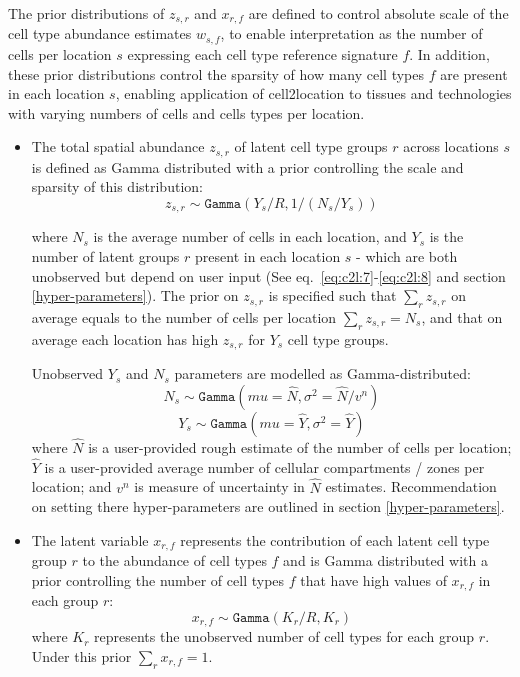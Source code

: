 \documentclass[11pt,a4paper]{article}
\begin{document}
\begin{enumerate}
    The prior distributions of $z_{s,r}$ and $x_{r,f}$ are defined to control absolute scale of the cell type abundance estimates $w_{s,f}$, to enable interpretation as the number of cells per location $s$ expressing each cell type reference signature $f$. In addition, these prior distributions control the sparsity of how many cell types $f$ are present in each location $s$, enabling application of cell2location to tissues and technologies with varying numbers of cells and cells types per location.
    
    \begin{itemize}
        \item The total spatial abundance $z_{s,r}$ of latent cell type groups $r$ across locations $s$ is defined as Gamma distributed with a prior controlling the scale and sparsity of this distribution:
        \begin{equation} \label{eq:c2l:6}
        z_{s,r} \sim \mathtt{Gamma}(Y_s / R, 1 / (N_s / Y_s))
        \end{equation}
    
        where $N_s$ is the average number of cells in each location, and $Y_s$ is the number of latent groups $r$  present in each location $s$ - which are both unobserved but depend on user input (See eq.~\eqref{eq:c2l:7}-\eqref{eq:c2l:8} and  section \ref{hyper-parameters}). The prior on $z_{s,r}$ is specified such that $\sum_{r} z_{s,r}$ on average equals to the number of cells per location $\sum_{r} z_{s,r} = N_s$, and that on average each location has high $z_{s,r}$ for $Y_s$ cell type groups. 
        
        Unobserved $Y_s$ and $N_s$ parameters are modelled as Gamma-distributed:
        \begin{equation} \label{eq:c2l:7}
        N_s \sim \mathtt{Gamma}(mu=\hat{N}, \sigma^2=\hat{N} / v^{n})
        \end{equation}
        \begin{equation} \label{eq:c2l:8}
        Y_s \sim \mathtt{Gamma}(mu=\hat{Y}, \sigma^2=\hat{Y})
        \end{equation}
        where $\hat{N}$ is a user-provided rough estimate of the number of cells per location; $\hat{Y}$ is a user-provided average number of cellular compartments / zones per location; and $v^{n}$ is measure of uncertainty in $\hat{N}$ estimates. Recommendation on setting there hyper-parameters are outlined in section \ref{hyper-parameters}.
        
        \item The latent variable $x_{r,f}$ represents the contribution of each latent cell type group $r$ to the abundance of cell types $f$ and is Gamma distributed with a prior controlling the number of cell types $f$ that have high values of $x_{r,f}$ in each group $r$:
        \begin{equation} \label{eq:c2l:10}
        x_{r,f} \sim \mathtt{Gamma}(K_r / R, K_r)
        \end{equation}
        where $K_r$ represents the unobserved number of cell types for each group $r$. Under this prior $\sum_{r} x_{r,f} = 1$.
        

\end{itemize}
\end{enumerate}
\end{document}
